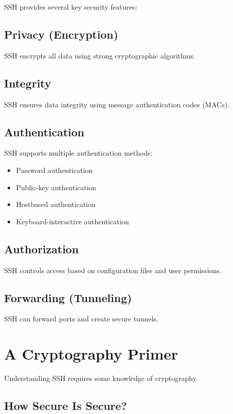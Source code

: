 \documentclass[12pt]{book}
\begin{document}
SSH provides several key security features:

\subsection{Privacy (Encryption)}

SSH encrypts all data using strong cryptographic algorithms.

\subsection{Integrity}

SSH ensures data integrity using message authentication codes (MACs).

\subsection{Authentication}

SSH supports multiple authentication methods:
\begin{itemize}
    \item Password authentication
    \item Public-key authentication
    \item Hostbased authentication
    \item Keyboard-interactive authentication
\end{itemize}

\subsection{Authorization}

SSH controls access based on configuration files and user permissions.

\subsection{Forwarding (Tunneling)}

SSH can forward ports and create secure tunnels.

\section{A Cryptography Primer}

Understanding SSH requires some knowledge of cryptography.

\subsection{How Secure Is Secure?}
\end{document}
